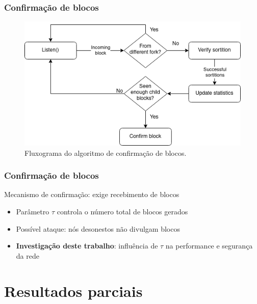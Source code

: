\documentclass{beamer}
\begin{document}
\begin{frame}
\frametitle{Confirmação de blocos}
\begin{figure}
    \centering
    \includegraphics[height=0.6\textheight]{images/confirmation_fluxogram.png}
    \caption{Fluxograma do algoritmo de confirmação de blocos.}
\end{figure}
\end{frame}

\begin{frame}
\frametitle{Confirmação de blocos}
Mecanismo de confirmação: exige recebimento de blocos

\begin{itemize}
    \item<1-> Parâmetro $\tau$ controla o número total de blocos gerados
    \item<2-> Possível ataque: nós desonestos não divulgam blocos
    \item<3-> \textbf{Investigação deste trabalho}: influência de $\tau$ na performance e segurança da rede

\end{itemize}
\end{frame}

\section{Resultados parciais}
\end{document}
